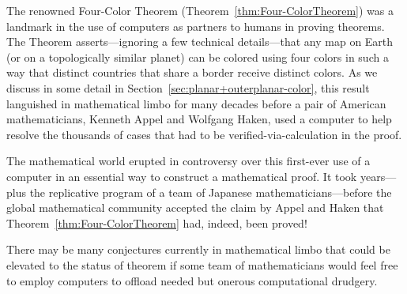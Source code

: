 The renowned Four-Color Theorem (Theorem~\ref{thm:Four-ColorTheorem})
was a landmark in the use of computers as partners to humans in
proving theorems.  The Theorem asserts---ignoring a few technical
details---that any map on Earth (or on a topologically similar planet)
can be colored using four colors in such a way that distinct countries
that share a border receive distinct colors.  As we discuss in some
detail in Section~\ref{sec:planar+outerplanar-color}, this result
languished in mathematical limbo for many decades before a pair of
American mathematicians, Kenneth Appel  and
Wolfgang Haken,  used a computer to help
resolve the thousands of cases that had to be verified-via-calculation
in the proof.

The mathematical world erupted in controversy over this first-ever use
of a computer in an essential way to construct a mathematical proof.
It took years---plus the replicative program of a team of Japanese
mathematicians---before the global mathematical community accepted the
claim by Appel and Haken that Theorem~\ref{thm:Four-ColorTheorem} had,
indeed, been proved!

There may be many conjectures currently in mathematical limbo that
could be elevated to the status of theorem if some team of
mathematicians would feel free to employ computers to offload needed
but onerous computational drudgery.



%
%
%


